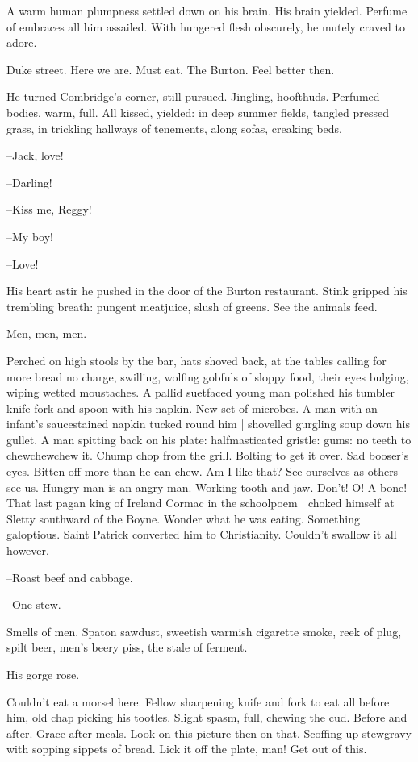 A warm human plumpness settled down on his brain.
His brain yielded.
Perfume of embraces all him assailed.
With hungered flesh obscurely,
he mutely craved to adore.

Duke street.
Here we are.
Must eat.
The Burton.
Feel better then.

He turned Combridge's corner, still pursued.
Jingling, hoofthuds.
Perfumed bodies, warm, full.
All kissed, yielded:
in deep summer fields,
tangled pressed grass,
in trickling hallways of tenements,
along sofas, creaking beds.

--Jack,
love!

--Darling!

--Kiss me,
Reggy!

--My boy!

--Love!

His heart astir
he pushed in the door of the Burton restaurant.
Stink gripped his trembling breath:
pungent meatjuice, slush of greens.
See the animals feed.

Men, men, men.

Perched on high stools by the bar,
hats shoved back,
at the tables calling for more bread no charge,
swilling,
wolfing gobfuls of sloppy food,
their eyes bulging,
wiping wetted moustaches.
A pallid suetfaced young man polished his tumbler knife fork and spoon with his napkin.
New set of microbes.
A man with an infant's saucestained napkin tucked round him |
shovelled gurgling soup down his gullet.
A man spitting back on his plate:
halfmasticated gristle:
gums:
no teeth to chewchewchew it.
Chump chop from the grill.
Bolting to get it over.
Sad booser's eyes.
Bitten off more than he can chew.
Am I like that?
See ourselves as others see us.
Hungry man is an angry man.
Working tooth and jaw.
Don't!
O! A bone!
That last pagan king of Ireland Cormac in the schoolpoem |
choked himself at Sletty southward of the Boyne.
Wonder what he was eating.
Something galoptious.
Saint Patrick converted him to Christianity.
Couldn't swallow it all however.

--Roast beef and cabbage.

--One stew.

Smells of men.
Spaton sawdust,
sweetish warmish cigarette smoke,
reek of plug, spilt beer,
men's beery piss,
the stale of ferment.

His gorge rose.

Couldn't eat a morsel here.
Fellow sharpening knife and fork to eat all before him,
old chap picking his tootles.
Slight spasm, full, chewing the cud.
Before and after.
Grace after meals.
Look on this picture then on that.
Scoffing up stewgravy with sopping sippets of bread.
Lick it off the plate, man!
Get out of this.

